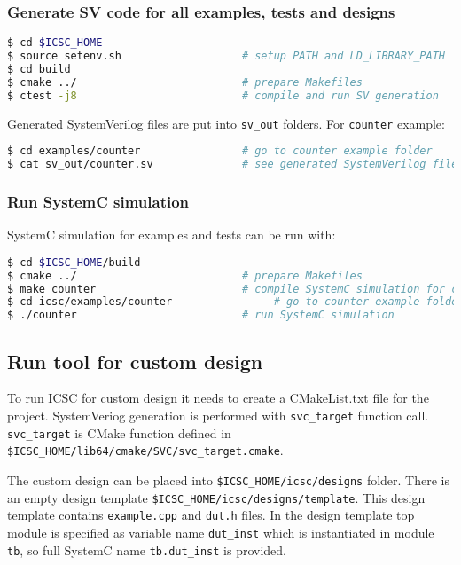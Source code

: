 \subsubsection{Generate SV code for all examples, tests and designs}
%
\begin{lstlisting}[language=bash]
$ cd $ICSC_HOME
$ source setenv.sh                   # setup PATH and LD_LIBRARY_PATH
$ cd build   
$ cmake ../                          # prepare Makefiles 
$ ctest -j8                          # compile and run SV generation
\end{lstlisting}

Generated SystemVerilog files are put into {\tt sv\_out} folders. 
For {\tt counter} example:
% 
\begin{lstlisting}[language=bash]
$ cd examples/counter                # go to counter example folder 
$ cat sv_out/counter.sv              # see generated SystemVerilog file 
\end{lstlisting}

\subsubsection{Run SystemC simulation}

SystemC simulation for examples and tests can be run with:
\begin{lstlisting}[language=bash]
$ cd $ICSC_HOME/build
$ cmake ../                          # prepare Makefiles 
$ make counter                       # compile SystemC simulation for counter example
$ cd icsc/examples/counter                # go to counter example folder
$ ./counter                          # run SystemC simulation 
\end{lstlisting}

\subsection{Run tool for custom design}

To run ICSC for custom design it needs to create a CMakeList.txt file for the project. SystemVeriog generation is performed with {\tt svc\_target} function call. {\tt svc\_target} is CMake function defined in {\tt \$ICSC\_HOME/lib64/cmake/SVC/svc\_target.cmake}. 

The custom design can be placed into {\tt \$ICSC\_HOME/icsc/designs} folder. 
There is an empty design template {\tt\$ICSC\_HOME/icsc/designs/template}. This design template contains {\tt example.cpp} and {\tt dut.h} files. 
In the design template top module is specified as  variable name {\tt dut\_inst} which is instantiated in module {\tt tb}, so full SystemC name {\tt tb.dut\_inst} is provided.

